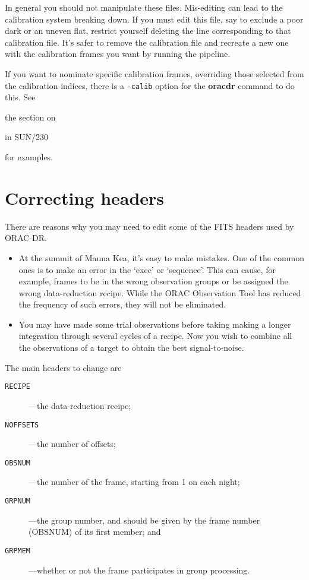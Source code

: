 \documentclass[twoside,11pt,nolof]{starlink}
\providecommand{\ORACDR}{{\footnotesize ORAC-DR}}
\begin{document}
In general you should not manipulate these files.  Mis-editing can
lead to the calibration system breaking down.  If you must edit this
file, say to exclude a poor dark or an uneven flat, restrict yourself
deleting the line corresponding to that calibration file.  It's safer
to remove the calibration file and recreate a new one with the
calibration frames you want by running the pipeline.

If you want to nominate specific calibration frames, overriding those
selected from the calibration indices, there is a \texttt{-calib} option
for the \textbf{oracdr} command to do this.  See
\begin{latexonly}
the section on
\end{latexonly}
\begin{latexonly}
in SUN/230
\end{latexonly}
for examples.

\section{Correcting headers\label{correcting_headers}}

There are reasons why you may need to edit some of the FITS headers
used by \ORACDR.

\begin{itemize}
\item  At the summit of Mauna Kea, it's easy to make mistakes.  One of
the common ones is to make an error in the `exec' or `sequence'.  This
can cause, for example, frames to be in the wrong observation groups
or be assigned the wrong data-reduction recipe.  While the ORAC
Observation Tool has reduced the frequency of such errors, they will
not be eliminated.

\item You may have made some trial observations before taking making
a longer integration through several cycles of a recipe.  Now you wish
to combine all the observations of a target to obtain the best
signal-to-noise.
\end{itemize}

The main headers to change are
\begin{description}
\item [\texttt{RECIPE}]---the data-reduction recipe;
\item [\texttt{NOFFSETS}]---the number of offsets;
\item [\texttt{OBSNUM}]---the number of the frame, starting from 1 on
each night;
\item [\texttt{GRPNUM}]---the group number, and should be
given by the frame number (OBSNUM) of its first member; and
\item [\texttt{GRPMEM}]---whether or not the frame participates in group
processing.
\end{description}
\end{document}
